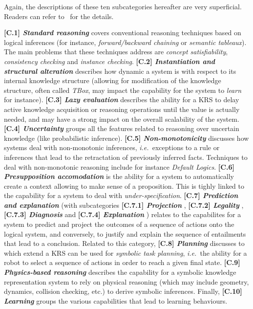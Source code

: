 \documentclass{IEEEtran}
\newcommand{\ie}{{\textit{i.e.\ }}}
\newcommand{\taxon}[2]{%
    \textbf{[#1] \emph{#2}}
}
\begin{document}
Again, the descriptions of these ten subcategories hereafter are very
superficial. Readers can refer to~\cite{blabla} for the details.

\taxon{C.1}{Standard reasoning} covers conventional reasoning techniques based
on logical inferences (for instance, \emph{forward/backward chaining} or
\emph{semantic tableaux}). The main problems that these techniques address are
\emph{concept satisfiability}, \emph{consistency checking} and \emph{instance
checking}. \taxon{C.2}{Instantiation and structural alteration} describes how
dynamic a system is with respect to its internal knowledge structure (allowing
for modification of the knowledge structure, often called \emph{TBox}, may
impact the capability for the system to \emph{learn} for instance).
\taxon{C.3}{Lazy evaluation} describes the ability for a KRS to delay active
knowledge acquisition or reasoning operations until the value is actually
needed, and may have a strong impact on the overall scalability of the system.
\taxon{C.4}{Uncertainty} groups all the features related to reasoning over
uncertain knowledge (like probabilistic inference).
\taxon{C.5}{Non-monotonicity} discusses how systems deal with non-monotonic
inferences, \ie exceptions to a rule or inferences that lead to the retractation
of previously inferred facts. Techniques to deal with non-monotonic reasoning
include for instance \emph{Default Logics}.  \taxon{C.6}{Presupposition
accomodation} is the ability for a system to automatically create a context
allowing to make sense of a proposition. This is tighly linked to the capability
for a system to deal with \emph{under-specification}. \taxon{C.7}{Prediction and
explanation} (with subcategories \taxon{C.7.1}{Projection},
\taxon{C.7.2}{Legality}, \taxon{C.7.3}{Diagnosis} and
\taxon{C.7.4}{Explanation}) relates to the capabilites for a system to predict
and project the outcomes of a sequence of actions onto the logical system, and
conversely, to justify and explain the sequence of entailments that lead to a
conclusion. Related to this category, \taxon{C.8}{Planning} discusses to which
extend a KRS can be used for \emph{symbolic task planning}, \ie the ability for
a robot to select a sequence of actions in order to reach a given final state.
\taxon{C.9}{Physics-based reasoning} describes the capability for a symbolic
knowledge representation system to rely on physical reasoning (which may include
geometry, dynamics, collision checking, etc.) to derive symbolic inferences.
Finally, \taxon{C.10}{Learning} groups the various capabilities that lead to
learning behaviours.
\end{document}
